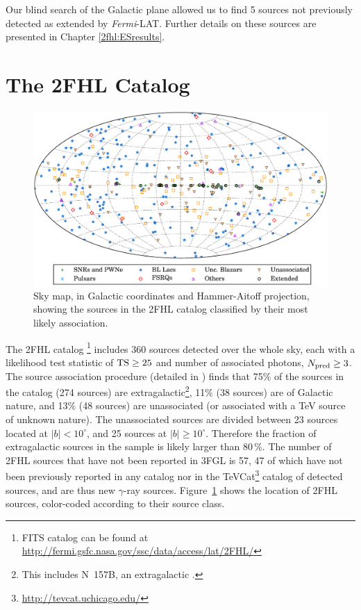 {Our blind search of the Galactic plane allowed us to find 5 sources not previously detected as extended by {\it Fermi}-LAT.  Further details on these sources are presented in Chapter \ref{2fhl:ESresults}.



%
%

\section{The 2FHL Catalog}
\label{2fhl:results}
\begin{figure}[!ht]
	\centering
	\includegraphics[width=\textwidth]{Figures/all-sky_assoc.eps} 
	\caption[Sky map showing 2FHL source positions and classifications]{Sky map, in Galactic coordinates and Hammer-Aitoff projection,
		showing the sources in the 2FHL catalog classified by their most likely association. 
		\label{fig:all_sky}}
\end{figure}
The 2FHL catalog \footnote{FITS catalog can be found at \url{http://fermi.gsfc.nasa.gov/ssc/data/access/lat/2FHL/}} includes 360 sources detected over the whole sky, each with a likelihood test statistic of ${\rm TS}\geq 25$ and number of associated photons, $N_{\rm pred}\geq 3$. 
The source association procedure (detailed in \cite{2FHL}) finds that 75\% of the sources in the catalog (274 sources) are extragalactic\footnote{This includes N~157B, an extragalactic \pwn{}.}, 11\% (38 sources) are of Galactic nature, and 13\% (48 sources) are unassociated (or associated with a TeV source of unknown nature). The unassociated sources are divided between 23 sources located at $|b|<10^{\circ}$, and 25 sources at $|b|\geq 10^{\circ}$. Therefore the fraction of extragalactic sources in the sample is likely larger than 80\,\%. The number of 2FHL sources that have not been reported in 3FGL is 57, 47 of which have not been previously reported in any \lat{} catalog nor in the TeVCat\footnote{\url{http://tevcat.uchicago.edu/}} catalog of \tev{} detected sources, and are thus new $\gamma$-ray sources. %
 Figure~\ref{fig:all_sky} shows the location of 2FHL sources, color-coded according to their source class.

}

